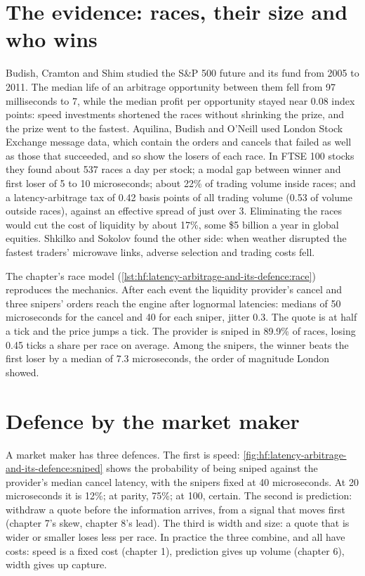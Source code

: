 \section{The evidence: races, their size and who wins}

Budish, Cramton and Shim studied the S\&P 500 future and its fund from 2005 to 2011. The median life of an arbitrage opportunity between them fell from
97 milliseconds to 7, while the median profit per opportunity stayed near 0.08 index points: speed investments shortened the races without shrinking
the prize, and the prize went to the fastest. Aquilina, Budish and O'Neill used London Stock Exchange message data, which contain the orders and
cancels that failed as well as those that succeeded, and so show the losers of each race. In FTSE 100 stocks they found about 537 races a day per
stock; a modal gap between winner and first loser of 5 to 10 microseconds; about 22\% of trading volume inside races; and a latency-arbitrage tax of
0.42 basis points of all trading volume (0.53 of volume outside races), against an effective spread of just over 3. Eliminating the races would cut
the cost of liquidity by about 17\%, some \$5 billion a year in global equities. Shkilko and Sokolov found the other side: when weather disrupted the
fastest traders' microwave links, adverse selection and trading costs fell.

The chapter's race model (\cref{lst:hf:latency-arbitrage-and-its-defence:race}) reproduces the mechanics. After each event the liquidity provider's
cancel and three snipers' orders reach the engine after lognormal latencies: medians of 50 microseconds for the cancel and 40 for each sniper,
jitter 0.3. The quote is at half a tick and the price jumps a tick. The provider is sniped in 89.9\% of races, losing 0.45 ticks a share per race on
average. Among the snipers, the winner beats the first loser by a median of 7.3 microseconds, the order of magnitude London showed.

\section{Defence by the market maker}

A market maker has three defences. The first is speed: \cref{fig:hf:latency-arbitrage-and-its-defence:sniped} shows the probability of being
sniped against the provider's median cancel latency, with the snipers fixed at 40 microseconds. At 20 microseconds it is 12\%; at parity, 75\%; at
100, certain. The second is prediction: withdraw a quote before the information arrives, from a signal that moves first (chapter 7's skew, chapter
8's lead). The third is width and size: a quote that is wider or smaller loses less per race. In practice the three combine, and all have costs:
speed is a fixed cost (chapter 1), prediction gives up volume (chapter 6), width gives up capture.

